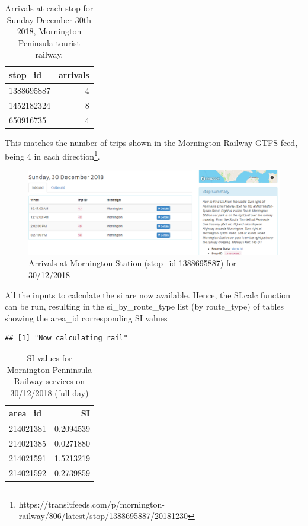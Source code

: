 \documentclass[preprint, 3p,
authoryear]{elsarticle} %
\begin{document}
\begin{table}

\caption{\label{tab:arrivals_mornington_20181230}Arrivals at each stop for Sunday December 30th 2018, Mornington Peninsula tourist railway.}
\centering
\begin{tabular}[t]{l|r}
\hline
stop\_id & arrivals\\
\hline
1388695887 & 4\\
\hline
1452182324 & 8\\
\hline
650916735 & 4\\
\hline
\end{tabular}
\end{table}

This matches the number of trips shown in the Mornington Railway GTFS
feed, being 4 in each direction\footnote{https://transitfeeds.com/p/mornington-railway/806/latest/stop/1388695887/20181230}.

\begin{figure}
\includegraphics[width=1\linewidth]{graphics/1388695887_inbound} \caption{Arrivals at Mornington Station (stop_id 1388695887) for 30/12/2018}\label{fig:SI_Mornington_arrivals}
\end{figure}

All the inputs to calculate the si are now available. Hence, the SI.calc
function can be run, resulting in the si\_by\_route\_type list (by
route\_type) of tables showing the area\_id corresponding SI values

\begin{verbatim}
## [1] "Now calculating rail"
\end{verbatim}

\begin{table}
\caption{\label{tab:SI_mornington_20181230}SI values for Mornington Penninsula Railway services on 30/12/2018 (full day)}

\centering
\begin{tabular}[t]{l|r}
\hline
area\_id & SI\\
\hline
214021381 & 0.2094539\\
\hline
214021385 & 0.0271880\\
\hline
214021591 & 1.5213219\\
\hline
214021592 & 0.2739859\\
\hline
\end{tabular}
\end{table}
\end{document}
